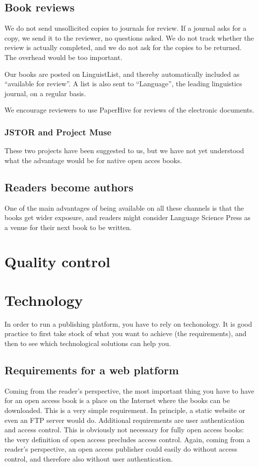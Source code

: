 \documentclass[output=guidelines,guidelines] {langscibook}
\begin{document}
\subsection{Book reviews}
We do not send unsollicited copies to journals for review. If a journal asks for a copy, we send it to the reviewer, no questions asked. We do not track whether the review is actually completed, and we do not ask for the copies to be returned. The overhead would be too important. 

Our books are posted on LinguistList, and thereby automatically included as ``available for review''. A list is also sent to ``Language'', the leading linguistics journal, on a regular basis. 

We encourage reviewers to use PaperHive for reviews of the electronic documents.

                      
\subsubsection{JSTOR and Project Muse}                      
These two projects have been suggested to us, but we have not yet understood what the advantage would be for native open acces books.


\subsection{Readers become authors}
One of the main advantages of being available on all these channels is that the books get wider exposure, and readers might consider Language Science Press as a venue for their next book to be written. %

\section{Quality control}
                    
                    
\section{Technology}
In order to run a publishing platform, you have to rely on techonology. It is good practice to first take stock of what you want to achieve (the requirements), and then to see which technological solutions can help you. 

\subsection{Requirements for a web platform}
Coming from the reader's perspective, the most important thing you have to have for an open access book is a place on the Internet where the books can be downloaded. This is a very simple requirement. In principle, a static website or even an FTP server would do. Additional requirements are user authentication and access control. This is obviously not necessary for fully open access books: the very definition of open access precludes access control. Again, coming from a reader's perspective, an open access publisher could easily do without access control, and therefore also without user authentication. 
\end{document}
